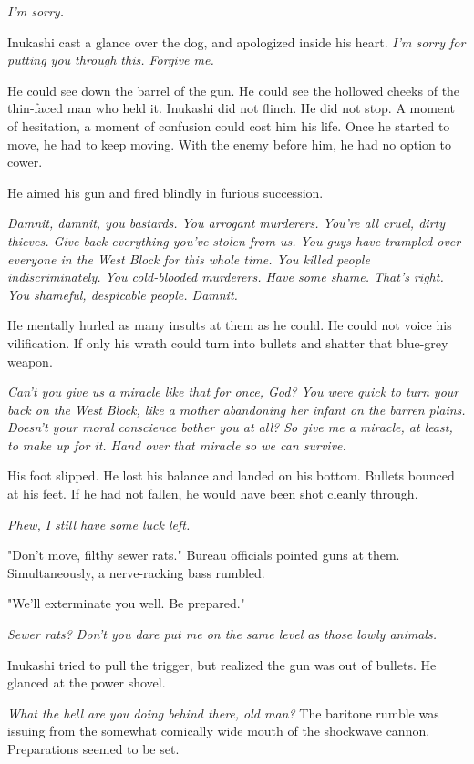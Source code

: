 \emph{I'm sorry.}

Inukashi cast a glance over the dog, and apologized inside his heart.
\emph{I'm sorry for putting you through this. Forgive me.}

He could see down the barrel of the gun. He could see the hollowed
cheeks of the thin-faced man who held it. Inukashi did not flinch. He
did not stop. A moment of hesitation, a moment of confusion could cost
him his life. Once he started to move, he had to keep moving. With the
enemy before him, he had no option to cower.

He aimed his gun and fired blindly in furious succession.

\emph{Damnit, damnit, you bastards. You arrogant murderers. You're all cruel,
dirty thieves. Give back everything you've stolen from us. You guys have
trampled over everyone in the West Block for this whole time. You killed
people indiscriminately. You cold-blooded murderers. Have some shame.
That's right. You shameful, despicable people. Damnit.}

He mentally hurled as many insults at them as he could. He could not
voice his vilification. If only his wrath could turn into bullets and
shatter that blue-grey weapon.

\emph{Can't you give us a miracle like that for once, God? You were quick to
turn your back on the West Block, like a mother abandoning her infant on
the barren plains. Doesn't your moral conscience bother you at all? So
give me a miracle, at least, to make up for it. Hand over that miracle
so we can survive.}

His foot slipped. He lost his balance and landed on his bottom. Bullets
bounced at his feet. If he had not fallen, he would have been shot
cleanly through.

\emph{Phew, I still have some luck left.}

"Don't move, filthy sewer rats." Bureau officials pointed guns at them.
Simultaneously, a nerve-racking bass rumbled.

"We'll exterminate you well. Be prepared."

\emph{Sewer rats? Don't you dare put me on the same level as those lowly
animals.}

Inukashi tried to pull the trigger, but realized the gun was out of
bullets. He glanced at the power shovel.

\emph{What the hell are you doing behind there, old man?} The baritone rumble
was issuing from the somewhat comically wide mouth of the shockwave
cannon. Preparations seemed to be set.

